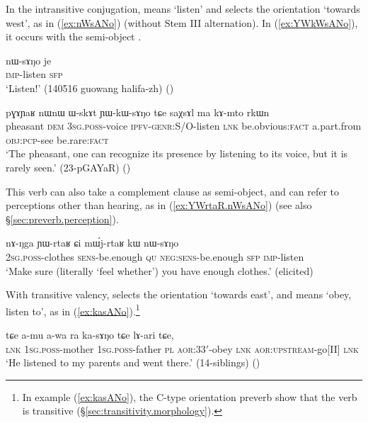 In the intransitive conjugation,  means `listen' and selects the orientation `towards west', as in (\ref{ex:nWsANo}) (without Stem III alternation). In (\ref{ex:YWkWsANo}), it occurs with the semi-object .

 \begin{exe}
\ex \label{ex:nWsANo}
\gll    nɯ-sɤŋo je  \\
 \textsc{imp}-listen \textsc{sfp} \\
\glt `Listen!' (140516 guowang halifa-zh) ()
\end{exe}

\begin{exe}
\ex \label{ex:YWkWsANo}
\gll pɣɤɲaʁ nɯnɯ ɯ-skɤt ɲɯ-kɯ-sɤŋo tɕe saχsɤl ma kɤ-mto rkɯn   \\ 
pheasant \textsc{dem} \textsc{3sg}.\textsc{poss}-voice \textsc{ipfv}-\textsc{genr}:\textsc{S/O}-listen \textsc{lnk} be.obvious:\textsc{fact} a.part.from \textsc{obj}:\textsc{pcp}-see be.rare:\textsc{fact} \\
 \glt `The pheasant, one can recognize its presence by listening to its voice, but it is rarely seen.'   (23-pGAYaR)
()
\end{exe} 

This verb can also take a complement clause as semi-object, and can refer to perceptions other than hearing, as in (\ref{ex:YWrtaR.nWsANo}) (see also §\ref{sec:preverb.perception}).

\begin{exe}
\ex \label{ex:YWrtaR.nWsANo}
\gll nɤ-ŋga ɲɯ-rtaʁ ɕi mɯ́j-rtaʁ kɯ nɯ-sɤŋo \\
\textsc{2sg}.\textsc{poss}-clothes \textsc{sens}-be.enough \textsc{qu} \textsc{neg}:\textsc{sens}-be.enough \textsc{sfp} \textsc{imp}-listen \\
\glt  `Make sure (literally `feel whether') you have enough clothes.' (elicited)
\end{exe} 

With transitive valency,  selects the orientation `towards east', and means `obey, listen to', as in (\ref{ex:kasANo}).\footnote{In example (\ref{ex:kasANo}), the C-type orientation preverb show that the verb is transitive (§\ref{sec:transitivity.morphology}).}

\begin{exe}
\ex \label{ex:kasANo}
\gll  tɕe a-mu a-wa ra ka-sɤŋo tɕe lɤ-ari tɕe, 	 \\
\textsc{lnk} \textsc{1sg}.\textsc{poss}-mother \textsc{1sg}.\textsc{poss}-father \textsc{pl} \textsc{aor}:3\fl{}3$'$-obey \textsc{lnk}  \textsc{aor}:\textsc{upstream}-go[II] \textsc{lnk}\\
 \glt `He listened to my parents and went there.' (14-siblings)
()
\end{exe}  

